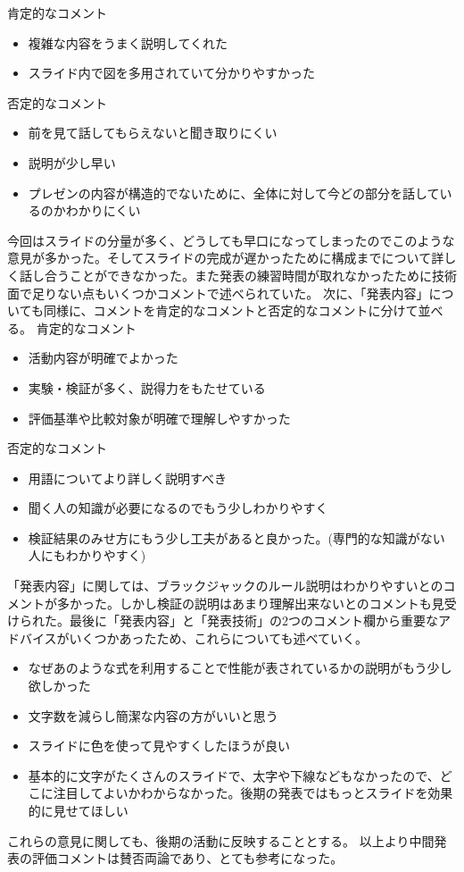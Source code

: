 肯定的なコメント
\begin{itemize}
\item 複雑な内容をうまく説明してくれた
\item スライド内で図を多用されていて分かりやすかった
\end{itemize}

否定的なコメント
\begin{itemize}
\item 前を見て話してもらえないと聞き取りにくい
\item 説明が少し早い
\item プレゼンの内容が構造的でないために、全体に対して今どの部分を話しているのかわかりにくい
\end{itemize}

今回はスライドの分量が多く、どうしても早口になってしまったのでこのような意見が多かった。そしてスライドの完成が遅かったために構成までについて詳しく話し合うことができなかった。また発表の練習時間が取れなかったために技術面で足りない点もいくつかコメントで述べられていた。
次に、「発表内容」についても同様に、コメントを肯定的なコメントと否定的なコメントに分けて並べる。
肯定的なコメント
\begin{itemize}
\item 活動内容が明確でよかった
\item 実験・検証が多く、説得力をもたせている
\item 評価基準や比較対象が明確で理解しやすかった
\end{itemize}

否定的なコメント
\begin{itemize}
\item 用語についてより詳しく説明すべき
\item 聞く人の知識が必要になるのでもう少しわかりやすく
\item 検証結果のみせ方にもう少し工夫があると良かった。(専門的な知識がない人にもわかりやすく)
\end{itemize}

「発表内容」に関しては、ブラックジャックのルール説明はわかりやすいとのコメントが多かった。しかし検証の説明はあまり理解出来ないとのコメントも見受けられた。最後に「発表内容」と「発表技術」の2つのコメント欄から重要なアドバイスがいくつかあったため、これらについても述べていく。　
\begin{itemize}
\item なぜあのような式を利用することで性能が表されているかの説明がもう少し欲しかった
\item 文字数を減らし簡潔な内容の方がいいと思う
\item スライドに色を使って見やすくしたほうが良い
\item 基本的に文字がたくさんのスライドで、太字や下線などもなかったので、どこに注目してよいかわからなかった。後期の発表ではもっとスライドを効果的に見せてほしい
\end{itemize}
これらの意見に関しても、後期の活動に反映することとする。
以上より中間発表の評価コメントは賛否両論であり、とても参考になった。
